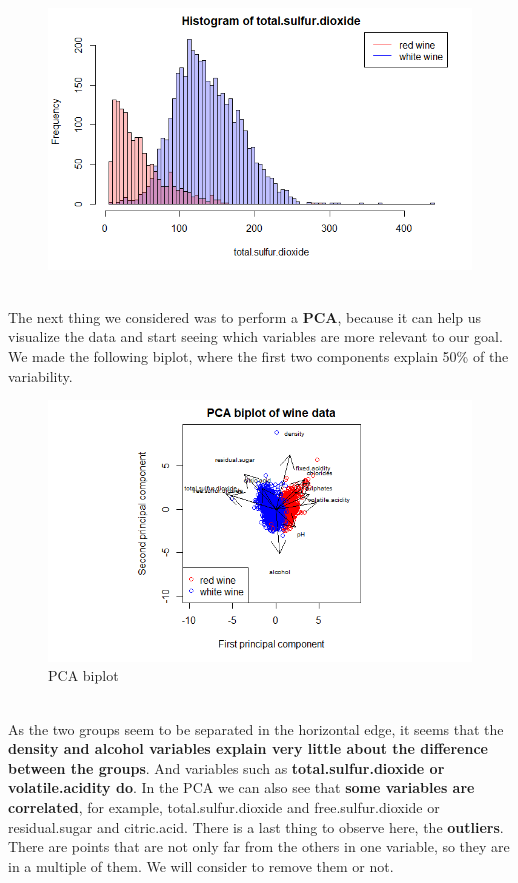 \documentclass[10pt]{article}
\begin{document}
\begin{figure}[H]
\includegraphics[scale=0.4]{histogram_of_totalsulfurdioxide}
\end{figure}
\ \\
The next thing we considered was to perform a \textbf{PCA}, because it can help us visualize the data and start seeing which variables are more relevant to our goal. We made the following biplot, where the first two components explain 50\% of the variability. \\
\begin{figure}[H]
\centering
\caption{PCA biplot}
\includegraphics[scale=0.75]{PCA_biplot}
\end{figure}
\ \\
As the two groups seem to be separated in the horizontal edge, it seems that the \textbf{density and alcohol variables explain very little about the difference between the groups}. And variables such as \textbf{total.sulfur.dioxide or volatile.acidity do}. In the PCA we can also see that \textbf{some variables are correlated}, for example, total.sulfur.dioxide and free.sulfur.dioxide or residual.sugar and citric.acid. There is a last thing to observe here, the \textbf{outliers}. There are points that are not only far from the others in one variable, so they are in a multiple of them. We will consider to remove them or not.   \\ \ \\
\end{document}
